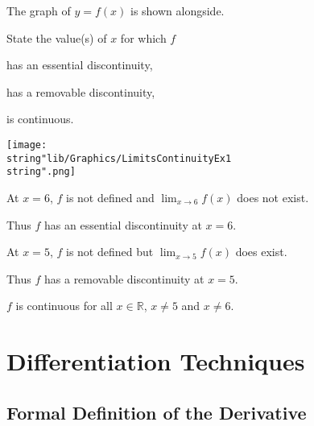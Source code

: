 \documentclass[11pt,a4paper]{book}
\newcommand{\R}{\mathbb{R}}
\begin{document}
\begin{example}

\begin{minipage}[t]{.5\textwidth}

The graph of $y=f\left(x\right)$ is shown alongside.

State the value(s) of $x$ for which $f$

\begin{tasks}[label=(\alph*),label-width=3.5ex]

\task  has an essential discontinuity,

\task  has a removable discontinuity,

\task  is continuous.

\end{tasks}

\end{minipage}
\begin{minipage}[t]{.5\textwidth}
\begin{center}
\texttt{[image: \\string"lib/Graphics/LimitsContinuityEx1\\string".png]}
\par\end{center}

\end{minipage}

\Solution

\begin{tasks}[label=(\alph*),label-width=3.5ex]

\task  At $x=6$, $f$ is not defined and ${\displaystyle \lim_{x\to6}f\left(x\right)}$
does not exist.

Thus $f$ has an essential discontinuity at $x=6$.

\task  At $x=5$, $f$ is not defined but ${\displaystyle \lim_{x\to5}f\left(x\right)}$
does exist.

Thus $f$ has a removable discontinuity at $x=5$.

\task  $f$ is continuous for all $x\in\R$, $x\neq5$ and $x\neq6$.

\end{tasks}

\end{example}

\chapter{Differentiation Techniques}
\section{Formal Definition of the Derivative}
\end{document}
